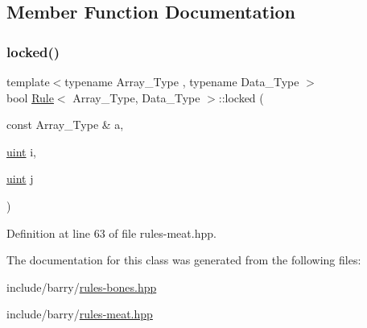 \subsection{Member Function Documentation}
\mbox{\label{class_rule_acc6742a89bbc5a29384e26dfd7a9488f}} 
\subsubsection{\texorpdfstring{locked()}{locked()}}
{\footnotesize\ttfamily template$<$typename Array\+\_\+\+Type , typename Data\+\_\+\+Type $>$ \\
bool \hyperlink{class_rule}{Rule}$<$ Array\+\_\+\+Type, Data\+\_\+\+Type $>$\+::locked (\begin{DoxyParamCaption}\item[{const Array\+\_\+\+Type \&}]{a,  }\item[{\hyperlink{typedefs_8hpp_a91ad9478d81a7aaf2593e8d9c3d06a14}{uint}}]{i,  }\item[{\hyperlink{typedefs_8hpp_a91ad9478d81a7aaf2593e8d9c3d06a14}{uint}}]{j }\end{DoxyParamCaption})\hspace{0.3cm}{\ttfamily [inline]}}



Definition at line 63 of file rules-\/meat.\+hpp.



The documentation for this class was generated from the following files\+:\begin{DoxyCompactItemize}
\item 
include/barry/\hyperlink{rules-bones_8hpp}{rules-\/bones.\+hpp}\item 
include/barry/\hyperlink{rules-meat_8hpp}{rules-\/meat.\+hpp}\end{DoxyCompactItemize}
